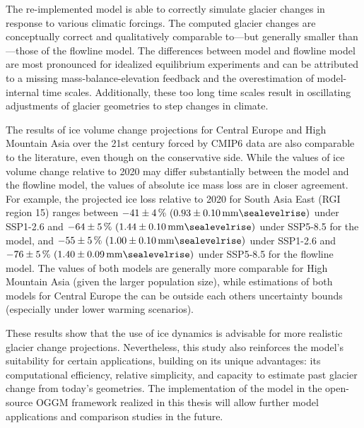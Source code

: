 The re-implemented \vas{} model is able to correctly simulate glacier changes in response to various climatic forcings. The computed glacier changes are conceptually correct and qualitatively comparable to---but generally smaller than---those of the flowline model. The differences between \vas{} model and flowline model are most pronounced for idealized equilibrium experiments and can be attributed to a missing mass-balance-elevation feedback and the overestimation of model-internal time scales. Additionally, these too long time scales result in oscillating adjustments of glacier geometries to step changes in climate.

The results of ice volume change projections for Central Europe and High Mountain Asia over the 21st century forced by CMIP6 data are also comparable to the literature, even though on the conservative side. While the values of ice volume change relative to 2020 may differ substantially between the \vas{} model and the flowline model, the values of absolute ice mass loss are in closer agreement. For example, the projected ice loss relative to 2020 for South Asia East (RGI region 15) ranges between $-41\SI{\pm4}{\percent} ~(0.93\SI{\pm0.10}{\milli\meter\sealevelrise})$ under SSP1-2.6 and $-64\SI{\pm5}{\percent} ~(1.44\SI{\pm0.10}{\milli\meter\sealevelrise})$ under SSP5-8.5 for the \vas{} model, and $-55\SI{\pm5}{\percent} ~(1.00\SI{\pm0.10}{\milli\meter\sealevelrise})$ under SSP1-2.6 and $-76\SI{\pm5}{\percent} ~(1.40\SI{\pm0.09}{\milli\meter\sealevelrise})$ under SSP5-8.5 for the flowline model. The values of both models are generally more comparable for High Mountain Asia (given the larger population size), while estimations of both models for Central Europe the can be outside each others uncertainty bounds (especially under lower warming scenarios).

These results show that the use of ice dynamics is advisable for more realistic glacier change projections. Nevertheless, this study also reinforces the \vas{} model's suitability for certain applications, building on its unique advantages: its computational efficiency, relative simplicity, and capacity to estimate past glacier change from today’s geometries. The implementation of the \vas{} model in the open-source OGGM framework realized in this thesis will allow further model applications and comparison studies in the future.
